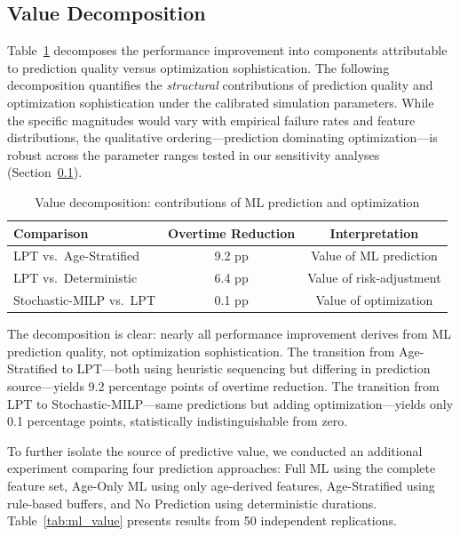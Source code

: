 \documentclass[11pt,a4paper]{article}
\begin{document}
\subsection{Value Decomposition}
\label{sec:value_analysis}

Table~\ref{tab:value_analysis} decomposes the performance improvement into components attributable to prediction quality versus optimization sophistication. The following decomposition quantifies the \textit{structural} contributions of prediction quality and optimization sophistication under the calibrated simulation parameters. While the specific magnitudes would vary with empirical failure rates and feature distributions, the qualitative ordering---prediction dominating optimization---is robust across the parameter ranges tested in our sensitivity analyses (Section~\ref{sec:value_analysis}).

\begin{table}[htbp]
\centering
\caption{Value decomposition: contributions of ML prediction and optimization}
\label{tab:value_analysis}
\begin{tabular}{@{}lcc@{}}
\toprule
\textbf{Comparison} & \textbf{Overtime Reduction} & \textbf{Interpretation} \\
\midrule
LPT vs.\ Age-Stratified & 9.2 pp & Value of ML prediction \\
LPT vs.\ Deterministic & 6.4 pp & Value of risk-adjustment \\
Stochastic-MILP vs.\ LPT & 0.1 pp & Value of optimization \\
\bottomrule
\end{tabular}
\end{table}

The decomposition is clear: nearly all performance improvement derives from ML prediction quality, not optimization sophistication. The transition from Age-Stratified to LPT---both using heuristic sequencing but differing in prediction source---yields 9.2 percentage points of overtime reduction. The transition from LPT to Stochastic-MILP---same predictions but adding optimization---yields only 0.1 percentage points, statistically indistinguishable from zero.

To further isolate the source of predictive value, we conducted an additional experiment comparing four prediction approaches: Full ML using the complete feature set, Age-Only ML using only age-derived features, Age-Stratified using rule-based buffers, and No Prediction using deterministic durations. Table~\ref{tab:ml_value} presents results from 50 independent replications.
\end{document}
